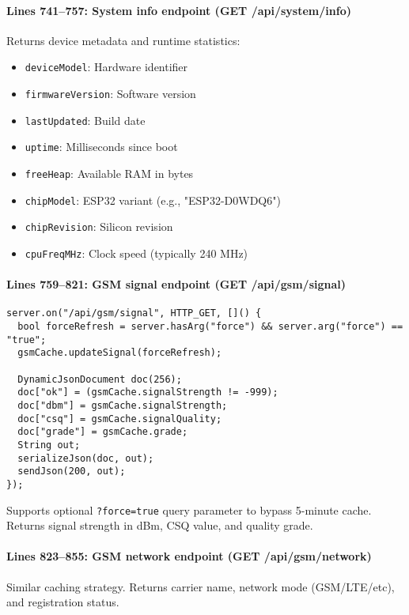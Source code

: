 \documentclass[11pt,a4paper]{article}
\begin{document}
\paragraph{Lines 741--757: System info endpoint (GET /api/system/info)}
Returns device metadata and runtime statistics:
\begin{itemize}[leftmargin=*]
  \item \texttt{deviceModel}: Hardware identifier
  \item \texttt{firmwareVersion}: Software version
  \item \texttt{lastUpdated}: Build date
  \item \texttt{uptime}: Milliseconds since boot
  \item \texttt{freeHeap}: Available RAM in bytes
  \item \texttt{chipModel}: ESP32 variant (e.g., "ESP32-D0WDQ6")
  \item \texttt{chipRevision}: Silicon revision
  \item \texttt{cpuFreqMHz}: Clock speed (typically 240 MHz)
\end{itemize}

\paragraph{Lines 759--821: GSM signal endpoint (GET /api/gsm/signal)}
\begin{verbatim}
server.on("/api/gsm/signal", HTTP_GET, []() {
  bool forceRefresh = server.hasArg("force") && server.arg("force") == "true";
  gsmCache.updateSignal(forceRefresh);
  
  DynamicJsonDocument doc(256);
  doc["ok"] = (gsmCache.signalStrength != -999);
  doc["dbm"] = gsmCache.signalStrength;
  doc["csq"] = gsmCache.signalQuality;
  doc["grade"] = gsmCache.grade;
  String out;
  serializeJson(doc, out);
  sendJson(200, out);
});
\end{verbatim}

Supports optional \texttt{?force=true} query parameter to bypass 5-minute cache. Returns signal strength in dBm, CSQ value, and quality grade.

\paragraph{Lines 823--855: GSM network endpoint (GET /api/gsm/network)}
Similar caching strategy. Returns carrier name, network mode (GSM/LTE/etc), and registration status.
\end{document}
